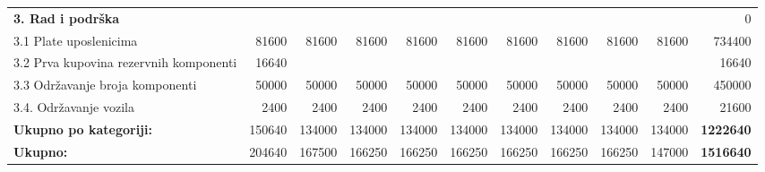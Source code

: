 \documentclass[12pt]{article}
\begin{document}
\begin{landscape}
\begin{table}[htbp]
\begin{tabular}{lrrrrrrrrrr}
    \midrule
    \textbf{3. Rad i podrška} &       &       &       &       &       &       &       &       &       & 0 \\
    3.1 Plate uposlenicima & 81600 & 81600 & 81600 & 81600 & 81600 & 81600 & 81600 & 81600 & 81600 & 734400 \\
    \multicolumn{1}{p{14.715em}}{3.2 Prva kupovina rezervnih\newline{} komponenti} & 16640 &       &       &       &       &       &       &       &       & 16640 \\
    3.3 Održavanje broja komponenti & 50000 & 50000 & 50000 & 50000 & 50000 & 50000 & 50000 & 50000 & 50000 & 450000 \\
    3.4. Održavanje vozila & 2400  & 2400  & 2400  & 2400  & 2400  & 2400  & 2400  & 2400  & 2400  & 21600 \\
    \midrule
    \textbf{Ukupno po kategoriji:} & 150640 & 134000 & 134000 & 134000 & 134000 & 134000 & 134000 & 134000 & 134000 & \textbf{1222640} \\
    \midrule
    \textbf{Ukupno:} & 204640 & 167500 & 166250 & 166250 & 166250 & 166250 & 166250 & 166250 & 147000 & \textbf{1516640} \\

    \bottomrule
    \end{tabular}%
  \label{rj2_100}%
\end{table}%

\end{landscape}
\end{document}
